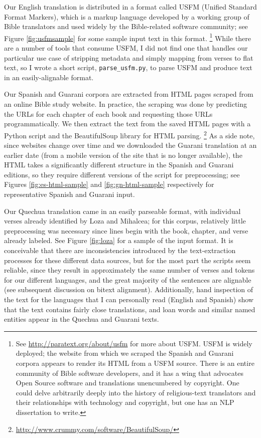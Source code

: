 Our English translation is distributed in a format called USFM (Unified
Standard Format Markers), which is a markup language developed by a working
group of Bible translators and used widely by the Bible-related software
community; see Figure \ref{fig:usfmsample} for some sample input text in this
format.
\footnote{See \url{http://paratext.org/about/usfm} for more about USFM. USFM is
widely deployed; the website from which we scraped the Spanish and Guarani
corpora appears to render its HTML from a USFM source.  There is an entire
community of Bible software developers, and it has a wing that advocates Open
Source software and translations unencumbered by copyright.  One could delve
arbitrarily deeply into the history of religious-text translators and their
relationships with technology and copyright, but one has an NLP dissertation to
write.}
While there are a number of tools that consume USFM, I did not find one that
handles our particular use case of stripping metadata and simply mapping from
verses to flat text, so I wrote a short script, \texttt{parse\_usfm.py}, to
parse USFM and produce text in an easily-alignable format.

Our Spanish and Guarani corpora are extracted from HTML pages scraped from an
online Bible study website. In practice, the scraping was done by predicting
the URLs for each chapter of each book and requesting those URLs
programmatically. We then extract the text from the saved HTML pages with a
Python script and the BeautifulSoup library for HTML parsing.
\footnote{\url{http://www.crummy.com/software/BeautifulSoup/}}
As a side note, since websites change over time and we
downloaded the Guarani translation at an earlier date (from a mobile version of
the site that is no longer available), the HTML takes a significantly different
structure in the Spanish and Guarani editions, so they require different
versions of the script for preprocessing; see Figures \ref{fig:es-html-sample}
and \ref{fig:gn-html-sample} respectively for representative Spanish and
Guarani input.

Our Quechua translation came in an easily parseable format, with individual
verses already identified by Loza and Mihalcea; for this corpus, relatively
little preprocessing was necessary since lines begin with the book, chapter,
and verse already labeled. See Figure \ref{fig:loza} for a sample of the input
format.
It is conceivable that there are inconsistencies introduced by the
text-extraction processes for these different data sources, but for the most
part the scripts seem reliable, since they result in approximately the same
number of verses and tokens for our different languages, and the great majority
of the sentences are alignable (see subsequent discussion on bitext alignment).
Additionally, hand inspection of the text for the languages that I can
personally read (English and Spanish) show that the text contains fairly close
translations, and loan words and similar named entities appear in the Quechua
and Guarani texts.

